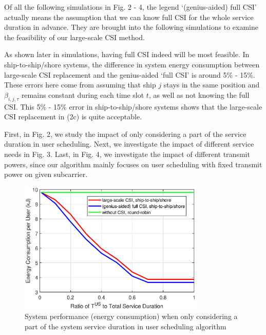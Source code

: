 \documentclass[journal]{IEEEtran}
\begin{document}
 Of all the following simulations in Fig. 2 - 4, %
 the legend `(genius-aided) full CSI' actually means the assumption that we can know full CSI for the whole service duration in advance. %
 They are brought into the following simulations to examine the feasibility of our large-scale CSI method. 
 
 
 As shown later in simulations, having full CSI indeed will be most feasible. In ship-to-ship/shore systems, the difference in system energy consumption between large-scale CSI replacement and the genius-aided `full CSI' is around 5\% - 15\%. These errors here come from assuming that ship $j$ stays in the same position and $\beta _{i,j,\tau }$ remains constant during each time slot $t$, as well as not knowing the full CSI.
 This 5\% - 15\% error in ship-to-ship/shore systems shows that the large-scale CSI replacement in (2c) is quite acceptable. 
  
 
 
 First, in Fig. 2, we study the impact of only considering a part of the service duration in user scheduling. 
 Next, we investigate the impact of different service needs in Fig. 3. 
 Last, in Fig. 4, we investigate the impact of different transmit powers, since our algorithm mainly focuses on user scheduling with fixed transmit power on given subcarrier. 
 
 
 \begin{figure} [htb]
 \begin{center}
 \includegraphics*[width=8.8cm]{Tranges.eps}
 \end{center}
 \vspace*{-4mm} 
 \caption{System performance (energy consumption) when only considering a part of the system service duration in user scheduling algorithm} \label{fig:2}
 \vspace*{-2mm} 
 \end{figure}
 
\end{document}
